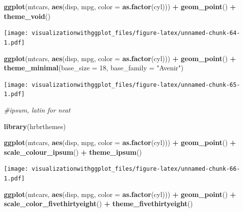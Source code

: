 \documentclass[]{krantz}
\makeatletter
\newenvironment{Shaded}{\begin{snugshade}}{\end{snugshade}}
\newcommand{\KeywordTok}[1]{\textcolor[rgb]{0.13,0.29,0.53}{\textbf{#1}}}
\newcommand{\DataTypeTok}[1]{\textcolor[rgb]{0.13,0.29,0.53}{#1}}
\newcommand{\DecValTok}[1]{\textcolor[rgb]{0.00,0.00,0.81}{#1}}
\newcommand{\StringTok}[1]{\textcolor[rgb]{0.31,0.60,0.02}{#1}}
\newcommand{\CommentTok}[1]{\textcolor[rgb]{0.56,0.35,0.01}{\textit{#1}}}
\newcommand{\OperatorTok}[1]{\textcolor[rgb]{0.81,0.36,0.00}{\textbf{#1}}}
\newcommand{\NormalTok}[1]{#1}
\newenvironment{kframe}{%
\medskip{}
\setlength{\fboxsep}{.8em}
 \def\at@end@of@kframe{}%
 \ifinner\ifhmode%
  \def\at@end@of@kframe{\end{minipage}}%
  \begin{minipage}{\columnwidth}%
 \fi\fi%
 \def\FrameCommand##1{\hskip\@totalleftmargin \hskip-\fboxsep
 \colorbox{shadecolor}{##1}\hskip-\fboxsep
     \hskip-\linewidth \hskip-\@totalleftmargin \hskip\columnwidth}%
 \MakeFramed {\advance\hsize-\width
   \@totalleftmargin\z@ \linewidth\hsize
   \@setminipage}}%
 {\par\unskip\endMakeFramed%
 \at@end@of@kframe}
\renewenvironment{Shaded}{\begin{kframe}}{\end{kframe}}
\theoremstyle{definition}
\theoremstyle{definition}
\theoremstyle{definition}
\theoremstyle{remark}
\makeatother
\begin{document}
\begin{Shaded}
\begin{Highlighting}[]
\KeywordTok{ggplot}\NormalTok{(mtcars, }\KeywordTok{aes}\NormalTok{(disp, mpg, }\DataTypeTok{color =} \KeywordTok{as.factor}\NormalTok{(cyl))) }\OperatorTok{+}\StringTok{ }
\StringTok{    }\KeywordTok{geom_point}\NormalTok{() }\OperatorTok{+}
\StringTok{    }\KeywordTok{theme_void}\NormalTok{()}
\end{Highlighting}
\end{Shaded}

\texttt{[image: visualizationwithggplot\_files/figure-latex/unnamed-chunk-64-1.pdf]}

\begin{Shaded}
\begin{Highlighting}[]
\KeywordTok{ggplot}\NormalTok{(mtcars, }\KeywordTok{aes}\NormalTok{(disp, mpg, }\DataTypeTok{color =} \KeywordTok{as.factor}\NormalTok{(cyl))) }\OperatorTok{+}\StringTok{ }
\StringTok{    }\KeywordTok{geom_point}\NormalTok{() }\OperatorTok{+}
\StringTok{  }\KeywordTok{theme_minimal}\NormalTok{(}\DataTypeTok{base_size =} \DecValTok{18}\NormalTok{, }\DataTypeTok{base_family =} \StringTok{"Avenir"}\NormalTok{)}
\end{Highlighting}
\end{Shaded}

\texttt{[image: visualizationwithggplot\_files/figure-latex/unnamed-chunk-65-1.pdf]}

\begin{Shaded}
\begin{Highlighting}[]
\CommentTok{#ipsum, latin for neat}

\KeywordTok{library}\NormalTok{(hrbrthemes)}

\KeywordTok{ggplot}\NormalTok{(mtcars, }\KeywordTok{aes}\NormalTok{(disp, mpg, }\DataTypeTok{color =} \KeywordTok{as.factor}\NormalTok{(cyl))) }\OperatorTok{+}\StringTok{ }
\StringTok{  }\KeywordTok{geom_point}\NormalTok{() }\OperatorTok{+}\StringTok{    }
\StringTok{  }\KeywordTok{scale_colour_ipsum}\NormalTok{() }\OperatorTok{+}\StringTok{ }
\StringTok{    }\KeywordTok{theme_ipsum}\NormalTok{()}
\end{Highlighting}
\end{Shaded}

\texttt{[image: visualizationwithggplot\_files/figure-latex/unnamed-chunk-66-1.pdf]}

\begin{Shaded}
\begin{Highlighting}[]
\KeywordTok{ggplot}\NormalTok{(mtcars, }\KeywordTok{aes}\NormalTok{(disp, mpg, }\DataTypeTok{color =} \KeywordTok{as.factor}\NormalTok{(cyl))) }\OperatorTok{+}\StringTok{ }
\StringTok{  }\KeywordTok{geom_point}\NormalTok{() }\OperatorTok{+}\StringTok{ }
\StringTok{  }\KeywordTok{scale_color_fivethirtyeight}\NormalTok{() }\OperatorTok{+}
\StringTok{    }\KeywordTok{theme_fivethirtyeight}\NormalTok{()}
\end{Highlighting}
\end{Shaded}
\end{document}
